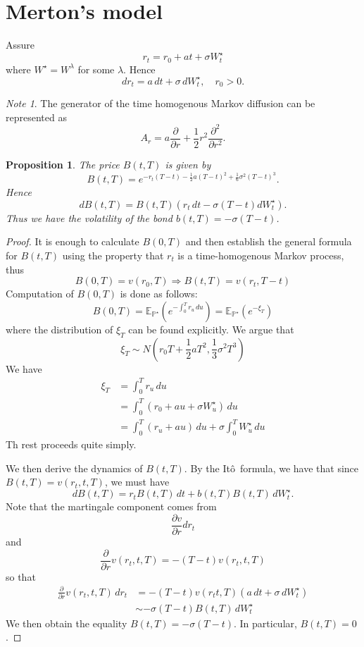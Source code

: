 \documentclass[10pt, oneside, reqno]{amsbook}
\theoremstyle{plain}%
\newtheorem{prop}[thm]{Proposition}
\theoremstyle{definition}
\theoremstyle{remark}
\newtheorem*{note}{Note}
\newcommand{\E}{\mathbb{E}}
\renewcommand{\P}{\mathbb{P}}
\newcommand{\ito}{It\^o\ }
\numberwithin{equation}{chapter}
\begin{document}
\section{Merton's model} %
\label{sub:merton_s_model}
	Assure \[
		r_t = r_0 + at + \sigma W_t^\star 
	\] where $W^\star = W^\lambda$ for some $\lambda$.  Hence
	\begin{equation}
		dr_t = a \, dt + \sigma \, dW^\star_t, \quad r_0 > 0.
	\end{equation} 
	\begin{note}
		The generator of the time homogenous Markov diffusion can be represented as \[
			A_r = a \frac{\partial }{\partial r} + \frac{1}{2} r^2 \frac{\partial^2}{\partial r^2}.  
		\]
	\end{note}

	\begin{prop}
		The price $B(t, T)$ is given by \begin{equation}
			\label{eq:merton_short_rate_price}
			B(t, T) = e^{-r_t(T-t) - \frac{1}{2}a(T-t)^2 + \frac{1}{6} \sigma^2(T-t)^3}.  
		\end{equation}  Hence \[
			dB(t, T) = B(t, T)\left(r_t \, dt - \sigma(T-t) dW^\star_t \right).
		\]  Thus we have the volatility of the bond $b(t, T) = -\sigma(T-t)$.
	\end{prop}
	
	\begin{proof}
		It is enough to calculate $B(0, T)$ and then establish the general formula for $B(t, T)$ using the property that $r_t$ is a time-homogenous Markov process, thus \[
			B(0, T) = v(r_0, T) \Rightarrow B(t, T) =v(r_t, T-t)
		\]
		Computation of $B(0, T)$ is done as follows:\[
			B(0, T) = \E_{\P^\star} \left(e^{-\int_0^T r_u \, du} \right) = \E_{\P^\star} \left( e^{-\xi_T} \right)
		\] where the distribution of $\xi_T$ can be found explicitly.  We argue that \[
			\xi_T \sim N\left(r_0 T + \frac{1}{2} a T^2, \frac{1}{3} \sigma^2 T^3 \right)
		\]  We have \begin{align*}
			\xi_T 	&= \int_0^T r_u \, du \\
					&= \int_0^T \left( r_0 + au + \sigma W^\star_u \right) \, du \\
					&= \int_0^T (r_u + au)  \, du + \sigma \int_0^T W^\star_u \, du
		\end{align*}
		Th rest proceeds quite simply.
		
		We then derive the dynamics of $B(t, T)$.  By the \ito formula, we have that since $B(t, T) = v(r_t, t, T)$, we must have \[
			dB(t, T) = r_t B(t, T) \, dt + b(t, T) B(t, T) \, dW^\star_t.  
		\] Note that the martingale component comes from \[
			\frac{\partial v}{\partial r} dr_t 
		\] and \[
			\frac{\partial}{\partial r}v(r_t, t, T) = -(T- t) v(r_t, t, T)
		\] so that \begin{align*}
			\frac{\partial}{\partial r}v(r_t, t, T) \, dr_t &= -(T-t) v(r_t t, T) (a \, dt + \sigma \, dW^\star_t) \\
			&\sim - \sigma(T- t)B(t, T) \, dW^\star_t
		\end{align*}  We then obtain the equality $B(t, T) = -\sigma(T-t)$.  In particular, $B(t, T) = 0$.  
	\end{proof}
	
\end{document}

